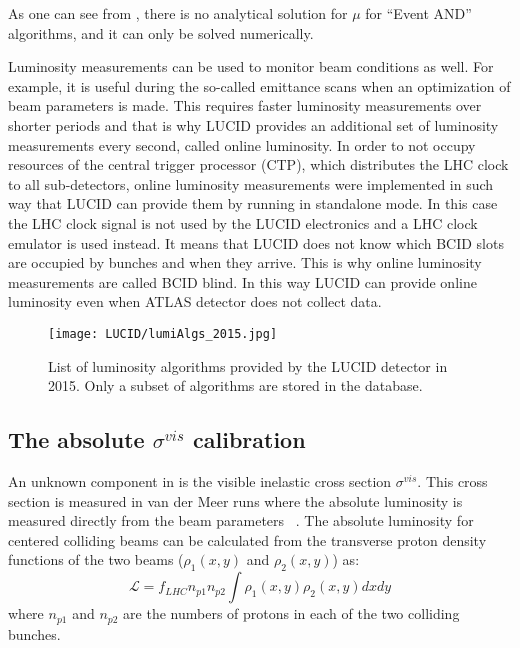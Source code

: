 As one can see from , there is no analytical solution for $\mu$ for ``Event AND'' algorithms, and it can only be solved numerically. 

Luminosity measurements can be used to monitor beam conditions as well.
For example, it is useful during the so-called emittance scans when an optimization of beam parameters is made.
This requires faster luminosity measurements over shorter periods and that is why LUCID provides an additional set of luminosity measurements every second, called online luminosity.
In order to not occupy resources of the central trigger processor (CTP), which distributes the LHC clock to all sub-detectors, 
online luminosity measurements were implemented in such way that LUCID can provide them by running in standalone mode.
In this case the LHC clock signal is not used by the LUCID electronics and a LHC clock emulator is used instead.
It means that LUCID does not know which BCID slots are occupied by bunches and when they arrive.
This is why online luminosity measurements are called BCID blind.
In this way LUCID can provide online luminosity even when ATLAS detector does not collect data.

\begin{figure}
\centering
\texttt{[image: LUCID/lumiAlgs\_2015.jpg]}
\caption{List of luminosity algorithms provided by the LUCID detector in 2015. Only a subset of algorithms are stored in the database.}
\label{fig:InternalConsistency}
\end{figure}

\subsection{The absolute $\sigma^{vis}$ calibration}
\label{subsec:alfa_run}
An unknown component in  is the visible inelastic cross section $\sigma^{vis}$.
This cross section is measured in van der Meer runs where the absolute luminosity is measured directly from the beam parameters ~\cite{vanderMeer:296752,Rubbia:1025746}.
The absolute luminosity for centered colliding beams can be calculated from the transverse proton density functions of the two beams ($\rho_{1}(x,y)$ and $\rho_{2}(x,y)$) as:
\begin{equation}
\mathscr{L} = f_{LHC} n_{p1} n_{p2} \int \rho_{1}(x,y) \rho_{2}(x,y) dx dy
\label{eq:lumi_vs_intensity}
\end{equation}
where $n_{p1}$ and $n_{p2}$ are the numbers of protons in each of the two colliding bunches.

